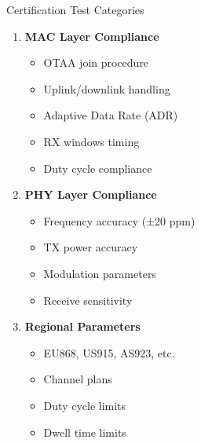 \documentclass{beamer}
\begin{document}
\begin{frame}{Certification Test Categories}
\begin{enumerate}
    \item \textbf{MAC Layer Compliance}
    \begin{itemize}
        \item OTAA join procedure
        \item Uplink/downlink handling
        \item Adaptive Data Rate (ADR)
        \item RX windows timing
        \item Duty cycle compliance
    \end{itemize}

    \item \textbf{PHY Layer Compliance}
    \begin{itemize}
        \item Frequency accuracy (±20 ppm)
        \item TX power accuracy
        \item Modulation parameters
        \item Receive sensitivity
    \end{itemize}

    \item \textbf{Regional Parameters}
    \begin{itemize}
        \item EU868, US915, AS923, etc.
        \item Channel plans
        \item Duty cycle limits
        \item Dwell time limits
    \end{itemize}
\end{enumerate}
\end{frame}
\end{document}
